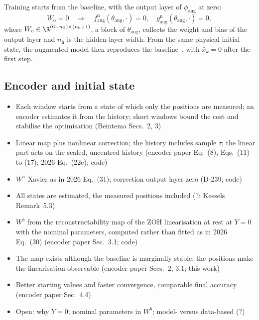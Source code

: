 Training starts from the baseline, with the output layer of
$\phi_{\mathrm{aug}}$ at zero:
\begin{equation}
 W_{\mathrm o}=0
 \quad\Longrightarrow\quad
 f^{\mathrm n}_{\mathrm{aug}}(\theta_{\mathrm{aug}},\cdot)=0,\quad
 g^{\mathrm n}_{\mathrm{aug}}(\theta_{\mathrm{aug}},\cdot)=0,
 \label{eq:aug_zero_init}
\end{equation}
where $W_{\mathrm o}\in\R^{(6+n_{\bar x})\times(n_{\mathrm h}+1)}$, a block of
$\theta_{\mathrm{aug}}$, collects the weight and bias of the output layer and
$n_{\mathrm h}$ is the hidden-layer width.
From the same physical initial state, the augmented model then reproduces the
baseline~\cite[Eq.~(29)]{hoekstra2026lfr}, with $\bar x_k=0$ after the first
step.

\subsection{Encoder and initial state}\label{sec:aug_encoder}
\ifdraft
\begin{itemize}
\item Each window starts from a state of which only the positions are measured; an encoder estimates it from the history; short windows bound the cost and stabilise the optimisation (Beintema Secs.~2, 3)
\item Linear map plus nonlinear correction; the history includes sample $\tau$; the linear part acts on the scaled, uncentred history (encoder paper Eq.~(8), Eqs.~(11) to (17); 2026 Eq.~(22e); code)
\item $W^a$ Xavier as in 2026 Eq.~(31); correction output layer zero (D-239; code)
\item All states are estimated, the measured positions included (?: Kessels Remark~5.3)
\item $W^b$ from the reconstructability map of the ZOH linearisation at rest at $Y=0$ with the nominal parameters, computed rather than fitted as in 2026 Eq.~(30) (encoder paper Sec.~3.1; code)
\item The map exists although the baseline is marginally stable: the positions make the linearisation observable (encoder paper Secs.~2, 3.1; this work)
\item Better starting values and faster convergence, comparable final accuracy (encoder paper Sec.~4.4)
\item Open: why $Y=0$; nominal parameters in $W^b$; model- versus data-based (?)
\end{itemize}
\fi

